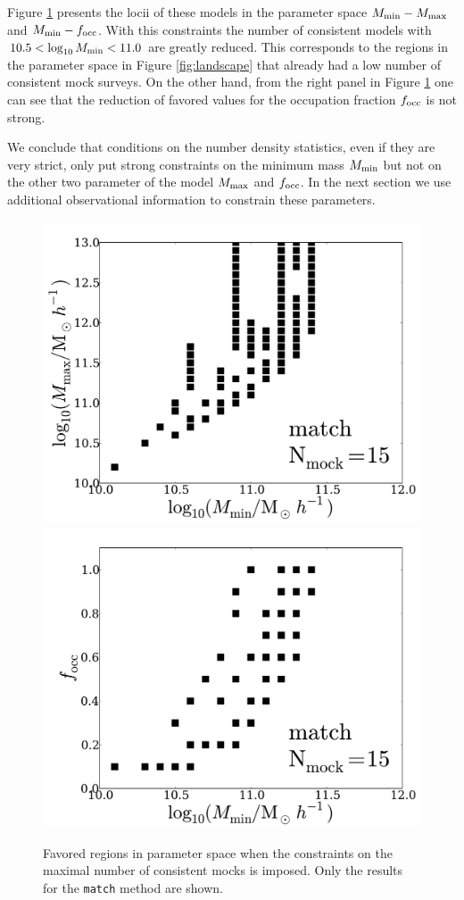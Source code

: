 \documentclass[usenatbib]{mn2e}
\begin{document}
Figure \ref{fig:restriction_mock} presents the locii of these models
in the parameter space $M_{\rm min}-M_{\rm max}$ and $M_{\rm
  min}-f_{\rm occ}$. With this constraints the
number of consistent models with  $10.5 < \log_{10}M_{\rm min}< 11.0$ are
greatly reduced. This corresponds to the regions in the parameter
space in Figure \ref{fig:landscape} that already had a low number of
consistent mock surveys. On the other hand, from the right panel in
Figure \ref{fig:restriction_mock} one can see that the reduction of
favored values for the occupation fraction $f_{\rm occ}$ is not strong. 

We conclude that conditions on the number density statistics, even if they are
very strict, only put strong constraints on the minimum mass $M_{\rm
  min}$ but not on the other two parameter of the model $M_{\rm max}$
and $f_{\rm occ}$. In the next section we use additional observational
information to constrain these parameters.

\begin{figure}
\begin{center}
\includegraphics[width=0.46\linewidth,angle=0]{Fig5_match_mass_mock.pdf} 
\hspace{5mm}
\includegraphics[width=0.46\linewidth,angle=0]{Fig5_match_f_occ_mock.pdf}
\end{center}  
\caption{Favored regions in parameter space when the constraints on
  the maximal number of consistent mocks is imposed. Only the results
  for the {\texttt{match}} method are shown.
  \label{fig:restriction_mock}}  
\end{figure}
\end{document}
